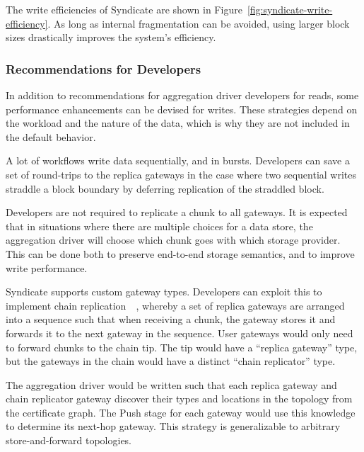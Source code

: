 The write efficiencies of Syndicate are shown in
Figure~\ref{fig:syndicate-write-efficiency}.  As long as internal fragmentation
can be avoided, using larger block sizes drastically improves the system's
efficiency.

\subsubsection{Recommendations for Developers}

In addition to recommendations for aggregation driver developers for reads, some
performance enhancements can be devised for writes.  These strategies depend on
the workload and the nature of the data, which is why they are not included in
the default behavior.

\hfill \break
{}
\hfill \break

A lot of workflows write data sequentially, and in bursts.
Developers can save a set of round-trips to the replica gateways
in the case where two sequential writes straddle a block boundary
by deferring replication of the straddled block.

\hfill \break
{}
\hfill \break

Developers are not required to replicate a chunk to all gateways.  It is
expected that in situations where there are multiple choices for a data store,
the aggregation driver will choose which chunk goes with which storage provider.
This can be done both to preserve end-to-end storage semantics, and to improve
write performance.

\hfill \break
{}
\hfill \break

Syndicate supports custom gateway types.  Developers can exploit this
to implement chain replication~\cite{chain-replication}~\cite{craq}, whereby a set of 
replica gateways are arranged into a sequence such that when receiving a chunk,
the gateway stores it and forwards it to the next gateway in the sequence.
User gateways would only need to forward chunks to the chain tip.  The tip would
have a ``replica gateway'' type, but the gateways in the chain would have a
distinct ``chain replicator'' type.

The aggregation driver would be written
such that each replica gateway and chain replicator gateway discover their
types and locations in the topology from the certificate graph.  The Push stage
for each gateway would use this knowledge to determine its next-hop gateway.
This strategy is generalizable to arbitrary store-and-forward topologies.

